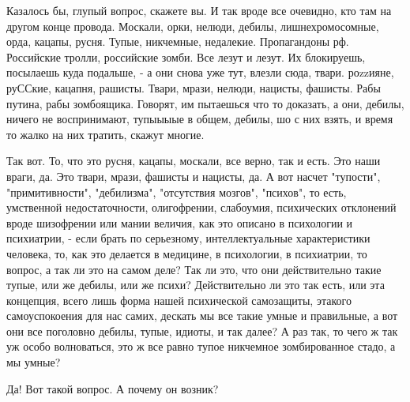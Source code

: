 Казалось бы, глупый вопрос, скажете вы. И так вроде все очевидно, кто там на
другом конце провода.  Москали, орки, нелюди, дебилы, лишнехромосомные, орда,
кацапы, русня. Тупые, никчемные, недалекие. Пропагандоны рф. Российские тролли,
российские зомби.  Все лезут и лезут. Их блокируешь, посылаешь куда подальше, -
а они снова уже тут, влезли сюда, твари. роzzияне, руССкие, кацапня, рашисты.
Твари, мрази, нелюди, нацисты, фашисты.  Рабы путина, рабы зомбоящика. Говорят,
им пытаешься что то доказать, а они, дебилы, ничего не воспринимают, тупыыыые в
общем, дебилы, шо с них взять, и время то жалко на них тратить, скажут многие.

Так вот. То, что это русня, кацапы, москали, все верно, так и есть. Это наши
враги, да. Это твари, мрази, фашисты и нацисты, да. А вот насчет "тупости",
"примитивности", "дебилизма", "отсутствия мозгов", "психов", то есть,
умственной недостаточности, олигофрении, слабоумия, психических отклонений
вроде шизофрении или мании величия, как это описано в психологии и психиатрии,
- если брать по серьезному, интеллектуальные характеристики человека, то, как
это делается в медицине, в психологии, в психиатрии, то вопрос, а так ли это на
самом деле? Так ли это, что они действительно такие тупые, или же дебилы, или
же психи?  Действительно ли это так есть, или эта концепция, всего лишь форма
нашей психической самозащиты, этакого самоуспокоения для нас самих, дескать мы
все такие умные и правильные, а вот они все поголовно дебилы, тупые, идиоты, и
так далее? А раз так, то чего ж так уж особо волноваться, это ж все равно тупое
никчемное зомбированное стадо, а мы умные?

Да! Вот такой вопрос. А почему он возник?
